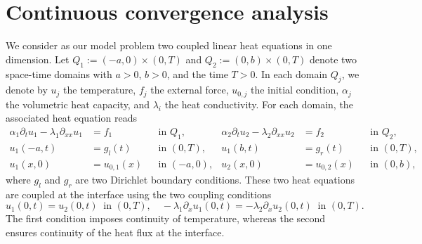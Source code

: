 \documentclass[reqno]{amsart}
\begin{document}
\section{Continuous convergence analysis}\label{sec:2}
	
We consider as our model problem two coupled linear heat equations in one dimension. Let $Q_1 := (-a, 0) \times (0, T)$ and $Q_2 := (0, b) \times (0, T)$ denote two space-time domains with $a>0$, $b>0$, and the time $T>0$. In each domain $Q_j$, we denote by $u_j$ the temperature, $f_j$ the external force, $u_{0, j}$ the initial condition, $\alpha_j$ the volumetric heat capacity, and $\lambda_i$ the heat conductivity. For each domain, the associated heat equation reads
\begin{equation}\label{eq:CoupledSystem}
	\begin{aligned}
	\alpha_1 \partial_t u_1 -\lambda_1 \partial_{xx} u_1 &= f_1& &\text{in } Q_1,&
	\alpha_2 \partial_t u_2 -\lambda_2 \partial_{xx} u_2 &= f_2&  &\text{in } Q_2,\\
	u_1(-a, t) &= g_l(t)& &\text{in } (0,T),&	
	u_1(b, t) &= g_r(t)&  &\text{in } (0,T),\\
	u_1(x, 0) &= u_{0, 1}(x)& &\text{in } (-a,0),& 
	u_2(x, 0) &= u_{0, 2}(x)& &\text{in } (0,b),
\end{aligned}
\end{equation}
where $g_l$ and $g_r$ are two Dirichlet boundary conditions. These two heat equations are coupled at the interface using the two coupling conditions
\begin{equation}\label{eq:CoupleCondition}
u_1(0, t) = u_2(0, t) \ \text{ in } (0,T), \quad 
-\lambda_1 \partial_x u_1(0, t) = -\lambda_2 \partial_x u_2(0, t) \ \text{ in } (0,T).
\end{equation}
The first condition imposes continuity of temperature, whereas the second ensures continuity of the heat flux at the interface.
\end{document}
